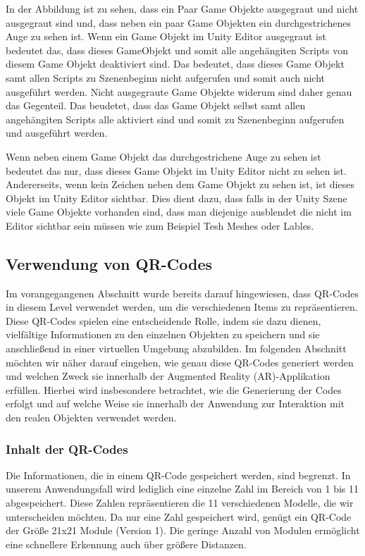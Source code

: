 In der Abbildung ist zu sehen, dass ein Paar Game Objekte ausgegraut und nicht ausgegraut sind und, dass neben ein paar Game Objekten ein durchgestrichenes Auge zu sehen ist.
Wenn ein Game Objekt im Unity Editor ausgegraut ist bedeutet das, dass dieses GameObjekt und somit alle angehängiten Scripts von diesem Game Objekt deaktiviert sind.
Das bedeutet, dass dieses Game Objekt samt allen Scripts zu Szenenbeginn nicht aufgerufen und somit auch nicht ausgeführt werden. Nicht ausgegraute Game Objekte widerum sind
daher genau das Gegenteil. Das beudetet, dass das Game Objekt selbst samt allen angehängiten Scripts alle aktiviert sind und somit zu Szenenbeginn aufgerufen und ausgeführt werden.

Wenn neben einem Game Objekt das durchgestrichene Auge zu sehen ist bedeutet das nur, dass dieses Game Objekt im Unity Editor nicht zu sehen ist. Andererseits, wenn kein Zeichen
neben dem Game Objekt zu sehen ist, ist dieses Objekt im Unity Editor sichtbar. Dies dient dazu, dass falls in der Unity Szene viele Game Objekte vorhanden sind, dass man
diejenige ausblendet die nicht im Editor sichtbar sein müssen wie zum Beispiel Tesh Meshes oder Lables.

\subsection{Verwendung von QR-Codes}
Im vorangegangenen Abschnitt wurde bereits darauf hingewiesen, dass QR-Codes in diesem Level verwendet werden,
um die verschiedenen Items zu repräsentieren. Diese QR-Codes spielen eine entscheidende Rolle, indem sie dazu dienen,
vielfältige Informationen zu den einzelnen Objekten zu speichern und sie anschließend in einer virtuellen Umgebung
abzubilden. Im folgenden Abschnitt möchten wir näher darauf eingehen, wie genau diese QR-Codes generiert werden
und welchen Zweck sie innerhalb der Augmented Reality (AR)-Applikation erfüllen. Hierbei wird insbesondere betrachtet,
wie die Generierung der Codes erfolgt und auf welche Weise sie innerhalb der Anwendung zur Interaktion mit den realen Objekten verwendet werden.

\subsubsection{Inhalt der QR-Codes}
Die Informationen, die in einem QR-Code gespeichert werden, sind begrenzt. In unserem Anwendungsfall wird lediglich eine
einzelne Zahl im Bereich von 1 bis 11 abgespeichert. Diese Zahlen repräsentieren die 11 verschiedenen Modelle, die wir
unterscheiden möchten. Da nur eine Zahl gespeichert wird, genügt ein QR-Code der Größe 21x21 Module (Version 1). Die
geringe Anzahl von Modulen ermöglicht eine schnellere Erkennung auch über größere Distanzen.

